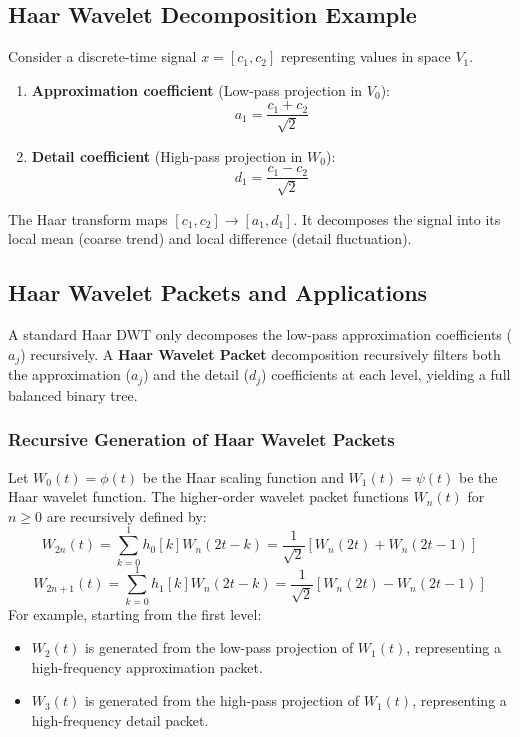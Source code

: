 \documentclass[12pt,a4paper]{article}
\begin{document}
\subsection{Haar Wavelet Decomposition Example}
Consider a discrete-time signal $x = [c_1, c_2]$ representing values in space $V_1$.
\begin{enumerate}[leftmargin=*, itemsep=4.5pt]
  \item \textbf{Approximation coefficient} (Low-pass projection in $V_0$):
        $$a_1 = \frac{c_1 + c_2}{\sqrt{2}}$$
  \item \textbf{Detail coefficient} (High-pass projection in $W_0$):
        $$d_1 = \frac{c_1 - c_2}{\sqrt{2}}$$
\end{enumerate}
The Haar transform maps $[c_1, c_2] \to [a_1, d_1]$. It decomposes the signal into its local mean (coarse trend) and local difference (detail fluctuation).

\subsection{Haar Wavelet Packets and Applications}
A standard Haar DWT only decomposes the low-pass approximation coefficients ($a_j$) recursively. A \textbf{Haar Wavelet Packet} decomposition recursively filters both the approximation ($a_j$) and the detail ($d_j$) coefficients at each level, yielding a full balanced binary tree.

\subsubsection{Recursive Generation of Haar Wavelet Packets}
Let $W_0(t) = \phi(t)$ be the Haar scaling function and $W_1(t) = \psi(t)$ be the Haar wavelet function. The higher-order wavelet packet functions $W_n(t)$ for $n \ge 0$ are recursively defined by:
$$W_{2n}(t) = \sum_{k=0}^{1} h_0[k] W_n(2t - k) = \frac{1}{\sqrt{2}} \left[ W_n(2t) + W_n(2t-1) \right]$$
$$W_{2n+1}(t) = \sum_{k=0}^{1} h_1[k] W_n(2t - k) = \frac{1}{\sqrt{2}} \left[ W_n(2t) - W_n(2t-1) \right]$$
For example, starting from the first level:
\begin{itemize}[leftmargin=*, itemsep=2pt]
  \item $W_2(t)$ is generated from the low-pass projection of $W_1(t)$, representing a high-frequency approximation packet.
  \item $W_3(t)$ is generated from the high-pass projection of $W_1(t)$, representing a high-frequency detail packet.
\end{itemize}
\end{document}
